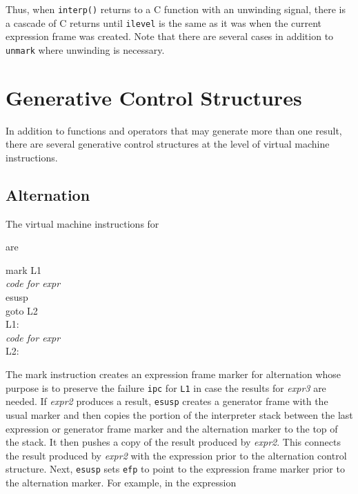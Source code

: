 Thus, when \texttt{interp()} returns to a C function with an unwinding
signal, there is a cascade of C returns until \texttt{ilevel} is the
same as it was when the current expression frame was created. Note
that there are several cases in addition to \texttt{unmark} where
unwinding is necessary.

\section{Generative Control Structures}

In addition to functions and operators that may generate more than one
result, there are several generative control structures at the level
of virtual machine instructions.

\subsection{Alternation}

The virtual machine instructions for


are
\begin{iconcode}
\>mark\>\>\> L1\\
\>\textit{code for expr}\\
\>esusp\\
\>goto\>\>\> L2\\
L1:\\
\>\textit{code for expr}\textit{}\\
L2:
\end{iconcode}

The mark instruction creates an expression frame marker for
alternation whose purpose is to preserve the failure \texttt{ipc} for
\texttt{L1} in case the results for \textit{expr3 }are needed. If
\textit{expr2 }produces a result, \texttt{esusp} creates a generator
frame with the usual marker and then copies the portion of the
interpreter stack between the last expression or generator frame
marker and the alternation marker to the top of the stack. It then
pushes a copy of the result produced by \textit{expr2}. This connects
the result produced by \textit{expr2 }with the expression prior to the
alternation control structure. Next, \texttt{esusp} sets \texttt{efp}
to point to the expression frame marker prior to the alternation
marker. For example, in the expression


